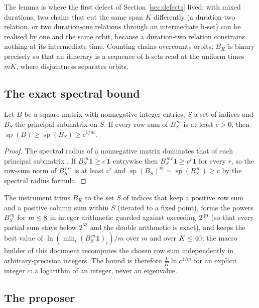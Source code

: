 \documentclass[11pt]{article}
\newcommand{\sprad}{\operatorname{sp}}
\begin{document}
The lemma is where the first defect of Section~\ref{sec:defects} lived: with mixed durations, two chains that cut
the same span $K$ differently (a duration-two relation, or two duration-one relations through an intermediate
h-set) can be realised by one and the same orbit, because a duration-two relation constrains nothing at its
intermediate time. Counting chains overcounts orbits; $B_K$ is binary precisely so that an itinerary is a sequence of
h-sets read at the uniform times $mK$, where disjointness separates orbits.

\subsection{The exact spectral bound}

\begin{lemma}\label{lem:spec}
Let $B$ be a square matrix with nonnegative integer entries, $S$ a set of indices and $B_S$ the principal submatrix
on $S$. If every row sum of $B_S^{\,m}$ is at least $c>0$, then $\sprad(B)\ge\sprad(B_S)\ge c^{1/m}$.
\end{lemma}

\begin{proof}
The spectral radius of a nonnegative matrix dominates that of each principal submatrix \cite[Chapter 8]{HJ85}. If
$B_S^{\,m}\mathbf 1\ge c\,\mathbf 1$ entrywise then $B_S^{\,mr}\mathbf 1\ge c^r\mathbf 1$ for every $r$, so the row-sum
norm of $B_S^{\,mr}$ is at least $c^r$ and $\sprad(B_S)^m=\sprad(B_S^{\,m})\ge c$ by the spectral radius formula.
\end{proof}

The instrument trims $B_K$ to the set $S$ of indices that keep a positive row sum and a positive column sum within
$S$ (iterated to a fixed point), forms the powers $B_S^{\,m}$ for $m\le8$ in integer arithmetic guarded against
exceeding $2^{49}$ (so that every partial sum stays below $2^{53}$ and the double arithmetic is exact), and keeps
the best value of $\ln(\min_i(B_S^{\,m}\mathbf 1)_i)/m$ over $m$ and over $K\le40$; the macro builder of this document
recomputes the chosen row sum independently in arbitrary-precision integers. The bound is therefore
$\frac1K\ln c^{1/m}$ for an explicit integer $c$: a logarithm of an integer, never an eigenvalue.

\subsection{The proposer}
\end{document}
